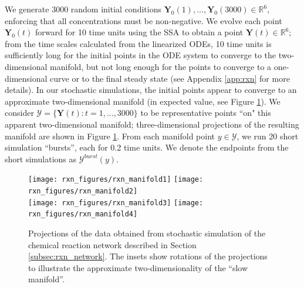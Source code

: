 \documentclass[aip,jcp,preprint]{revtex4-1}
\begin{document}
We generate 3000 random initial conditions $\mathbf{Y}_0(1), \dots, \mathbf{Y}_0(3000) \in \mathbb{R}^6$, enforcing that all concentrations
must be non-negative.
%
We evolve each point $\mathbf{Y}_0(t)$ forward for 10 time units using the SSA to obtain a point $\mathbf{Y}(t) \in \mathbb{R}^6$;
from the time scales calculated from the linearized ODEs, 10 time units is sufficiently long for the initial points in the ODE system to converge to the two-dimensional manifold,
but not long enough for the points to converge to a one-dimensional curve or to the final steady state (see Appendix \ref{app:rxn} for more details).
%
In our stochastic simulations, the initial points appear to converge to an approximate two-dimensional manifold
(in expected value, see Figure \ref{fig:rxn_manifolds}).
%
We consider $\mathcal{Y} = \{ \mathbf{Y}(t): t=1, \dots, 3000 \}$ to be representative points ``on" this apparent two-dimensional manifold;
three-dimensional projections of the resulting manifold are shown in Figure \ref{fig:rxn_manifolds}.
%
From each manifold point $y \in \mathcal{Y}$, we run 20 short simulation ``bursts'', each for 0.2 time units.
%
We denote the endpoints from the short simulations as $\mathcal{Y}^{burst}(y)$.

\begin{figure}[ht]
  \texttt{[image: rxn\_figures/rxn\_manifold1]}
  \texttt{[image: rxn\_figures/rxn\_manifold2]} \\
  \texttt{[image: rxn\_figures/rxn\_manifold3]}
  \texttt{[image: rxn\_figures/rxn\_manifold4]} \\
    \caption{Projections of the data obtained from stochastic simulation of the chemical reaction network described in Section \ref{subsec:rxn_network}. The insets show rotations of the projections to illustrate the approximate two-dimensionality of the ``slow manifold''.}
    \label{fig:rxn_manifolds}
\end{figure}
\end{document}
